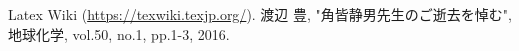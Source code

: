\documentclass[a4paper,10pt,twocolumn,uplatex]{jsarticle}
\begin{document}


\footnotesize{
  \begin{thebibliography}{99}
     Latex Wiki (\url{https://texwiki.texjp.org/}).
     渡辺 豊, "角皆静男先生のご逝去を悼む", 地球化学, vol.50, no.1, pp.1-3, 2016.
  \end{thebibliography}
}

\end{document}
